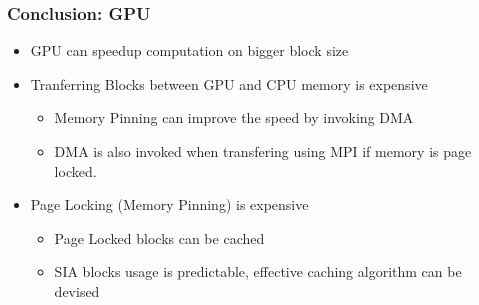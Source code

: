 \documentclass{beamer}
\begin{document}
\begin{frame}[fragile]
  \frametitle{Conclusion: GPU}
  \begin{itemize}
  \item<2-5> GPU can speedup computation on bigger block size
  \item<3-5> Tranferring Blocks between GPU and CPU memory is expensive
    \begin{itemize}
    \item<4-5> Memory Pinning can improve the speed by invoking DMA
      \item<5-5> DMA is also invoked when transfering using MPI if memory is page locked.
    \end{itemize}
  \item<6-> Page Locking (Memory Pinning) is expensive
    \begin{itemize}
    \item<7-> Page Locked blocks can be cached
    \item<8-> SIA blocks usage is predictable, effective caching algorithm can be devised
    \end{itemize}
  \end{itemize}
\end{frame}
\end{document}

